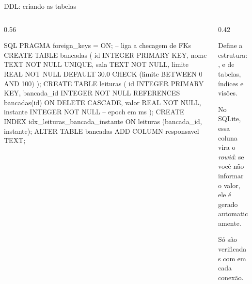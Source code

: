 \documentclass[aspectratio=169,10pt]{beamer}
\begin{document}
\begin{frame}[fragile]{DDL: criando as tabelas}
  \begin{columns}[T]
    \begin{column}{0.56\textwidth}
\begin{codigo}[title=labmonitor.sql]{SQL}
PRAGMA foreign_keys = ON;   -- liga a checagem de FKs
CREATE TABLE bancadas (
  id      INTEGER PRIMARY KEY,
  nome    TEXT    NOT NULL UNIQUE,
  sala    TEXT    NOT NULL,
  limite  REAL    NOT NULL DEFAULT 30.0
          CHECK (limite BETWEEN 0 AND 100)
);
CREATE TABLE leituras (
  id         INTEGER PRIMARY KEY,
  bancada_id INTEGER NOT NULL
             REFERENCES bancadas(id) ON DELETE CASCADE,
  valor      REAL    NOT NULL,
  instante   INTEGER NOT NULL          -- epoch em ms
);
CREATE INDEX idx_leituras_bancada_instante
  ON leituras (bancada_id, instante);
ALTER TABLE bancadas ADD COLUMN responsavel TEXT;
\end{codigo}
    \end{column}
    \begin{column}{0.42\textwidth}
      \begin{conceito}
        Define a estrutura: ,  e  de tabelas, índices e visões.
      \end{conceito}
      \begin{dica}
        No SQLite, essa coluna vira o \emph{rowid}: se você não informar o valor, ele é gerado automaticamente.
      \end{dica}
      \begin{atencao}
        Só são verificadas com  em cada conexão.
      \end{atencao}
    \end{column}
  \end{columns}
\end{frame}
\end{document}
